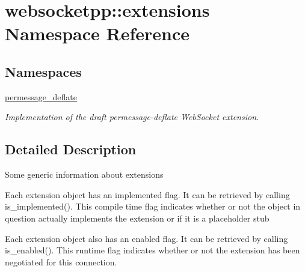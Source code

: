 \hypertarget{namespacewebsocketpp_1_1extensions}{}\section{websocketpp\+:\+:extensions Namespace Reference}
\label{namespacewebsocketpp_1_1extensions}
\subsection*{Namespaces}
\begin{DoxyCompactItemize}
\item 
 \mbox{\hyperlink{namespacewebsocketpp_1_1extensions_1_1permessage__deflate}{permessage\+\_\+deflate}}
\begin{DoxyCompactList}\small\item\em Implementation of the draft permessage-\/deflate Web\+Socket extension. \end{DoxyCompactList}\end{DoxyCompactItemize}


\subsection{Detailed Description}
Some generic information about extensions

Each extension object has an implemented flag. It can be retrieved by calling is\+\_\+implemented(). This compile time flag indicates whether or not the object in question actually implements the extension or if it is a placeholder stub

Each extension object also has an enabled flag. It can be retrieved by calling is\+\_\+enabled(). This runtime flag indicates whether or not the extension has been negotiated for this connection. 